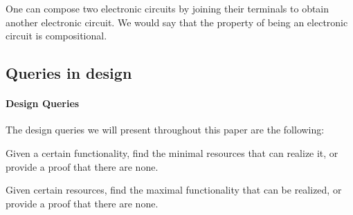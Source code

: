 \begin{example}
One can compose two electronic circuits by joining their terminals to obtain
another electronic circuit. We would say that the property
of being an electronic circuit is compositional.
\end{example}



\subsection{Queries in design}

\paragraph{Design Queries} The design queries we will present throughout this paper are the following:
\begin{compactitem}
\item Given a certain functionality, find the minimal resources that can realize it, or provide a proof that there are none.
\item Given certain resources, find the maximal functionality that can be realized, or provide a proof that there are none.
\item {} 
\end{compactitem}



